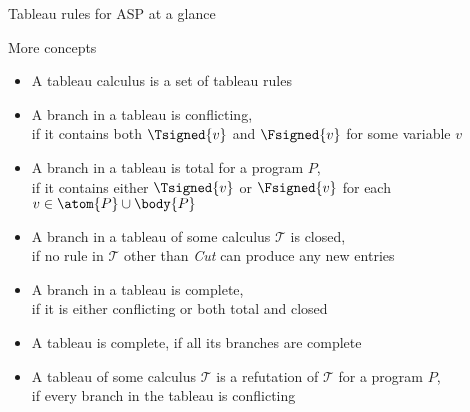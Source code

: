 \begin{frame}{Tableau rules for ASP at a glance}
  \vspace*{-5mm}
  
\end{frame}
\begin{frame}[c]{More concepts}
  \begin{itemize}
  \item <1-> A \alert{tableau calculus} is a set of tableau rules
  \item <2-> A branch in a tableau is \alert{conflicting},\\
    if it contains both $\Tsigned{v}$ and $\Fsigned{v}$ for some variable $v$
  \item <3-> A branch in a tableau is \alert{total} for a program $P$,\\
    if it contains either $\Tsigned{v}$ or $\Fsigned{v}$ for each $v \in \atom{P} \cup \body{P}$
  \item <4-> A branch in a tableau of some calculus $\mathcal{T}$ is \alert{closed},\\
    if no rule in $\mathcal{T}$ other than \textit{Cut} can produce any new entries
  \item <5-> A branch in a tableau is \alert{complete},\\
    if it is either conflicting or both total and closed
  \item <6-> A tableau is \alert{complete}, if all its branches are complete
  \item <7-> A tableau of some calculus $\mathcal{T}$ is a \alert{refutation} of $\mathcal{T}$ for a program $P$,\\
    if every branch in the tableau is conflicting
  \end{itemize}
\end{frame}
